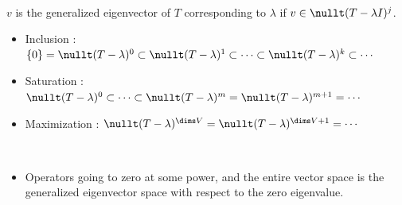      \\
    $v$ is the generalized eigenvector of $T$ corresponding to $\lambda$ if $v \in \nullt(T-\lambda
    I)^j$. \\

    \begin{itemize}
        \item Inclusion : $\{0\} = \nullt(T-\lambda)^{0} \subset \nullt(T-\lambda)^{1} \subset \cdots
            \subset \nullt(T-\lambda)^{k} \subset \cdots$
        \item Saturation : $\nullt(T-\lambda)^{0} \subset \cdots \subset
            \nullt(T-\lambda)^{m} = \nullt(T-\lambda)^{m+1} = \cdots$
        \item Maximization : $\nullt(T-\lambda)^{\dims V} = \nullt(T-\lambda)^{\dims V+1} = \cdots$
    \end{itemize}

     \\

    \begin{itemize}
        \item Operators going to zero at some power, and the entire vector space is the generalized
            eigenvector space with respect to the zero eigenvalue.
    \end{itemize}





